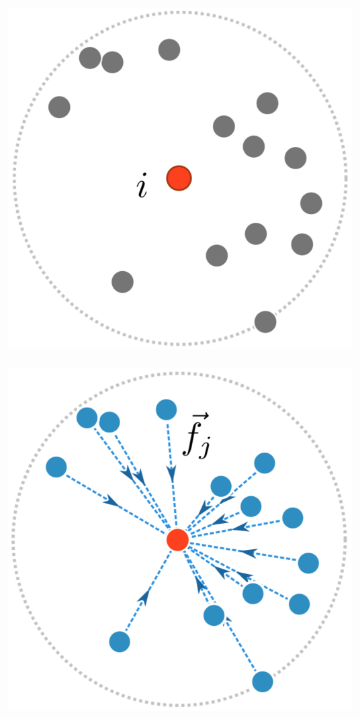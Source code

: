 \begin{figure}\label{f:photon-relaxation}
\begin{center}
	\begin{subfigure}[b]{0.32\textwidth}
		\includegraphics[width=1.0\textwidth]{graphics/pm/pm-14-1}
		\caption{}
	\end{subfigure}
	\begin{subfigure}[b]{0.32\textwidth}
		\includegraphics[width=1.0\textwidth]{graphics/pm/pm-14-2}

\end{subfigure}
\end{center}
\end{figure}
